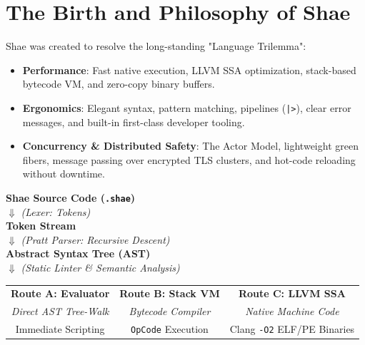 \section{The Birth and Philosophy of Shae}

Shae was created to resolve the long-standing "Language Trilemma":
\begin{itemize}
    \item \textbf{Performance}: Fast native execution, LLVM SSA optimization, stack-based bytecode VM, and zero-copy binary buffers.
    \item \textbf{Ergonomics}: Elegant syntax, pattern matching, pipelines (\texttt{|>}), clear error messages, and built-in first-class developer tooling.
    \item \textbf{Concurrency \& Distributed Safety}: The Actor Model, lightweight green fibers, message passing over encrypted TLS clusters, and hot-code reloading without downtime.
\end{itemize}


\centering
\begin{tcolorbox}[colback=white,colframe=shaeNavy,width=0.9\textwidth,title=\textbf{The Architecture Map of Shae}]
\centering
\small
\textbf{Shae Source Code (\texttt{.shae})}\\[4pt]
$\Downarrow$ \textsl{(Lexer: Tokens)}\\[4pt]
\textbf{Token Stream}\\[4pt]
$\Downarrow$ \textsl{(Pratt Parser: Recursive Descent)}\\[4pt]
\textbf{Abstract Syntax Tree (AST)}\\[4pt]
$\Downarrow$ \textsl{(Static Linter \& Semantic Analysis)}\\[4pt]
\begin{tabular}{ccc}
\textbf{Route A: Evaluator} & \textbf{Route B: Stack VM} & \textbf{Route C: LLVM SSA} \\
\textsl{Direct AST Tree-Walk} & \textsl{Bytecode Compiler} & \textsl{Native Machine Code} \\
Immediate Scripting & \texttt{OpCode} Execution & Clang \texttt{-O2} ELF/PE Binaries
\end{tabular}
\end{tcolorbox}

